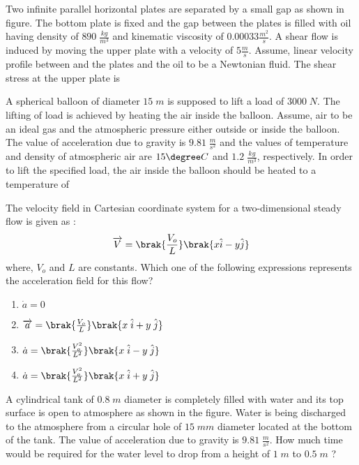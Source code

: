 \item Two infinite parallel horizontal plates are separated by a small gap  as shown in figure. The bottom plate is fixed and the gap between the plates is filled with oil having density of $890\;\frac{kg}{m^3}$ and kinematic viscosity of $0.00033\frac{m^2}{s}$. A shear flow is induced by moving the upper plate with a velocity of $5 \frac{m}{s}$. Assume, linear velocity profile between and the plates and the oil to be a Newtonian fluid. The shear stress  at the upper plate is \underline{\hspace{2cm}}
	
\item A spherical balloon of diameter $15\;m$ is supposed to lift a load of $3000\;N$. The lifting of load is achieved by heating the air inside the balloon. Assume, air to be an ideal gas and the atmospheric pressure either outside or inside the balloon. The value of acceleration due to gravity is $9.81\;\frac{m}{s^2}$ and the values of temperature and density of atmospheric air are $15\degree C$ and $1.2\;\frac{kg}{m^3}$, respectively. In order to lift the specified load, the air inside the balloon should be heated to a temperature  of \underline{\hspace{2cm}} 
\item The velocity field in Cartesian coordinate system for a two-dimensional steady flow is given as : $$\overrightarrow{V}=\brak{\frac{V_o}{L}}\brak{x \hat{i}-y \hat{j}}$$ where, $V_o$ and $L$ are constants. Which one of the following expressions represents the acceleration field  for this flow?
\begin{enumerate}
    \item $\dot{a}=0$
    \item $\overrightarrow{a}=\brak{\frac{V_o}{L}}\brak{x\;\hat{i}+y\;\hat{j}}$
    \item $\dot{a}=\brak{\frac{V_o^2}{L^2}}\brak{x\;\hat{i}-y\;\hat{j}}$
    \item $\dot{a}=\brak{\frac{V_o^2}{L^2}}\brak{x\;\hat{i}+y\;\hat{j}}$
\end{enumerate}
\item A cylindrical tank of $0.8\;m$ diameter is completely filled with water and its top surface is open to atmosphere as shown in the figure. Water is being discharged to the atmosphere from a circular hole of $15\;mm$ diameter located at the bottom of the tank. The value of acceleration due to gravity is $9.81\;\frac{m}{s^2}$. How much time  would be required for the water level to drop from a height of $1\;m$ to $0.5\;m$ ?  
